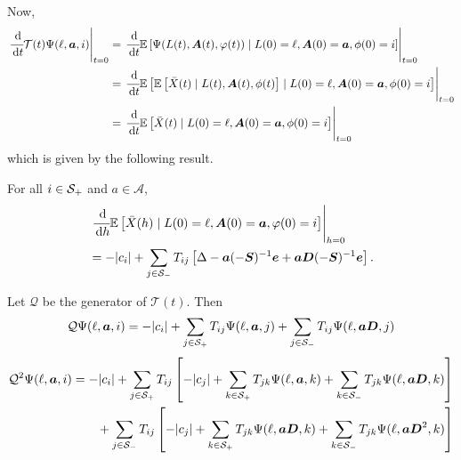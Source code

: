 Now, 
	\begin{align}
		\left.\cfrac{\, \mathrm{d} }{\, \mathrm{d} t}\mathcal T(t)\Psi(\ell,\boldsymbol a, i)\right|_{t=0}
		&= \left.\cfrac{\, \mathrm{d} }{\, \mathrm{d} t}\mathbb E\left[  \Psi(L(t),\boldsymbol A(t), \varphi(t)) \mid L(0)=\ell, \boldsymbol A(0)=\boldsymbol a, \phi(0)=i \right]\right|_{t=0} \nonumber 
		\\&= \left.\cfrac{\, \mathrm{d} }{\, \mathrm{d} t}\mathbb E\left[  \mathbb E\left[\bar X(t) \mid L(t), \boldsymbol A(t), \phi(t)\right] \mid L(0)=\ell, \boldsymbol A(0)=\boldsymbol a, \phi(0)=i \right]\right|_{t=0} \nonumber 
		\\&=\left.\cfrac{\, \mathrm{d} }{\, \mathrm{d} t}\mathbb E\left[ \bar X(t) \mid L(0)=\ell, \boldsymbol A(0)=\boldsymbol a, \phi(0)=i \right]\right|_{t=0}
	\end{align}
which is given by the following result. 
\begin{thm} For all \(i\in\mathcal{S}_+\) and \(a\in\mathcal A\), 
	\begin{align}
		&\left. \cfrac{\, \mathrm{d}}{\, \mathrm{d} h} \mathbb E\left[\bar X(h)\mid L(0)=\ell,\boldsymbol A(0)=\boldsymbol a,\varphi(0)=i\right] \right|_{h=0} \nonumber 
		\\&= -|c_i| + \sum_{j\in\mathcal S_-}T_{ij} \left[ \Delta - \boldsymbol a (-\boldsymbol S)^{-1}\boldsymbol e  +  \boldsymbol a\boldsymbol D(-\boldsymbol S)^{-1}\boldsymbol e \right] .
	\end{align}
\end{thm}
\begin{cor}
	Let \(\mathcal Q\) be the generator of \(\mathcal T(t)\). Then 
	\[\mathcal Q\Psi(\ell,\boldsymbol a,i) = -|c_i|+\sum_{j\in\mathcal{S}_+}T_{ij}\Psi(\ell,\boldsymbol a,j)+\sum_{j\in\mathcal{S}_-}T_{ij}\Psi(\ell,\boldsymbol a\boldsymbol D,j)\]
	\begin{align}
		\mathcal Q^2\Psi(\ell,\boldsymbol a,i) &= -|c_i|+\sum_{j\in\mathcal{S}_+}T_{ij}\left[-|c_j|+\sum_{k\in\mathcal{S}_+}T_{jk}\Psi(\ell,\boldsymbol a,k)+\sum_{k\in\mathcal{S}_-}T_{jk}\Psi(\ell,\boldsymbol a\boldsymbol D,k)\right] \nonumber 
		\\&\qquad +\sum_{j\in\mathcal{S}_-}T_{ij}\left[-|c_j|+\sum_{k\in\mathcal{S}_+}T_{jk}\Psi(\ell,\boldsymbol a\boldsymbol D,k)+\sum_{k\in\mathcal{S}_-}T_{jk}\Psi(\ell,\boldsymbol a\boldsymbol D^2,k)\right]
	\end{align}
\end{cor}
